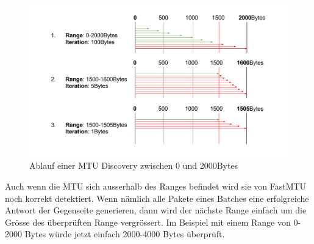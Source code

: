 \begin{figure}[ht]
    \begin{center}
        \includegraphics[trim=0 0 0 0,clip,width=\textwidth]{mainpart/implementation/img/FastMTUAlgorithm}
    \end{center}
    \caption{Ablauf einer MTU Discovery zwischen 0 und 2000Bytes}
\end{figure}

Auch wenn die \acs{MTU} sich ausserhalb des Ranges befindet wird sie von FastMTU noch korrekt detektiert. Wenn nämlich alle Pakete eines Batches eine erfolgreiche Antwort der Gegenseite generieren, dann wird der nächste Range einfach um die Grösse des überprüften Range vergrössert. Im Beispiel mit einem Range von 0-2000 Bytes würde jetzt einfach 2000-4000 Bytes überprüft.